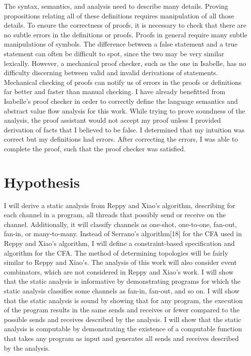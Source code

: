 \documentclass{article}
\begin{document}
The syntax, semantics, and analysis need to describe many details.  Proving propositions
relating all of these definitions requires manipulation of all those details.  To ensure the
correctness of proofs, it is necessary to check that there are no subtle errors in the
definitions or proofs.  Proofs in general require many subtle manipulations of symbols.  The
difference between a false statement and a true statement can often be difficult to spot, since
the two may be very similar lexically.  However, a mechanical proof checker, such as the one in
Isabelle, has no difficulty discerning between valid and invalid derivations of statements.
Mechanical checking of proofs can notify us of errors in the proofs or definitions far better
and faster than manual checking.  I have already benefitted from Isabelle's proof checker in
order to correctly define the language semantics and abstract value flow analysis for this
work.  While trying to prove soundness of the analysis, the proof assistant would not accept my
proof unless I provided derivation of facts that I believed to be false.  I determined that my
intuition was correct but my definitions had errors.  After correcting the errors, I was able
to complete the proof, such that the proof checker was satisfied.


\section{Hypothesis}
I will derive a static analysis from Reppy and Xiao's algorithm, describing for each channel in
a program, all threads that possibly send or receive on the channel.  Additionally, it will
classify channels as one-shot, one-to-one, fan-out, fan-in, or many-to-many.  Instead of
Serrano's algorithm[18] for the CFA used in Reppy and Xiao's algorithm, I will define a
constraint-based specification and algorithm for the CFA.  The method of determining topologies
will be fairly similar to Reppy and Xiao's.  The analysis of this work will also consider event
combinators, which are not considered in Reppy and Xiao's work.  I will show that the static
analysis is informative by demonstrating programs for which the static analysis classifies some
channels as fan-in, fan-out, and so on.  I will show that the static analysis is sound by
showing that for any program, the execution of the program results in the same sends and
receives or fewer compared to the possible sends and receives described by the analysis.  I
will show that the static analysis is computable by demonstrating the existence of a
computable function that takes any program as input and generates all sends and receives
described by the analysis.
\end{document}
